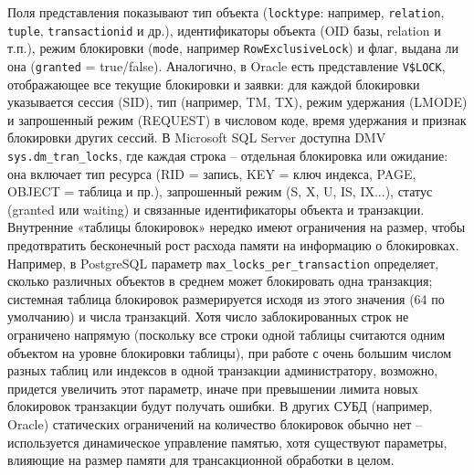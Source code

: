  Поля представления показывают тип объекта (\texttt{locktype}: например, \texttt{relation}, \texttt{tuple}, \texttt{transactionid} и др.), идентификаторы объекта (OID базы, relation и т.п.), режим блокировки (\texttt{mode}, например \texttt{RowExclusiveLock}) и флаг, выдана ли она (\texttt{granted} = true/false). Аналогично, в Oracle есть представление \texttt{V\$LOCK}, отображающее все текущие блокировки и заявки: для каждой блокировки указывается сессия (SID), тип (например, TM, TX), режим удержания (LMODE) и запрошенный режим (REQUEST) в числовом коде, время удержания и признак блокировки других сессий. В Microsoft SQL Server доступна DMV \texttt{sys.dm\_tran\_locks}, где каждая строка – отдельная блокировка или ожидание: она включает тип ресурса (RID = запись, KEY = ключ индекса, PAGE, OBJECT = таблица и пр.), запрошенный режим (S, X, U, IS, IX...), статус (granted или waiting) и связанные идентификаторы объекта и транзакции. Внутренние «таблицы блокировок» нередко имеют ограничения на размер, чтобы предотвратить бесконечный рост расхода памяти на информацию о блокировках. Например, в PostgreSQL параметр \texttt{max\_locks\_per\_transaction} определяет, сколько различных объектов в среднем может блокировать одна транзакция; системная таблица блокировок размерируется исходя из этого значения (64 по умолчанию) и числа транзакций. Хотя число заблокированных строк не ограничено напрямую (поскольку все строки одной таблицы считаются одним объектом на уровне блокировки таблицы), при работе с очень большим числом разных таблиц или индексов в одной транзакции администратору, возможно, придется увеличить этот параметр, иначе при превышении лимита новых блокировок транзакции будут получать ошибки. В других СУБД (например, Oracle) статических ограничений на количество блокировок обычно нет – используется динамическое управление памятью, хотя существуют параметры, влияющие на размер памяти для трансакционной обработки в целом. 
 
